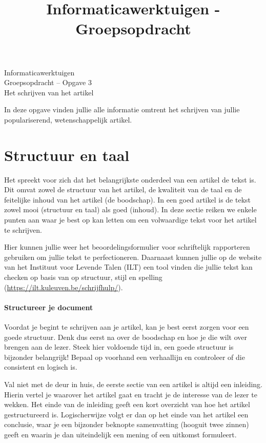 \documentclass[a4paper]{article}
\title{Informaticawerktuigen - Groepsopdracht}
\begin{document}
\begin{center}
  \huge Informaticawerktuigen \\
  \Huge Groepsopdracht -- Opgave 3 \\
  \huge Het schrijven van het artikel
\end{center}
\vspace{1em}

In deze opgave vinden jullie alle informatie omtrent het schrijven van jullie populariserend, wetenschappelijk artikel.


\section{Structuur en taal}

Het spreekt voor zich dat het belangrijkste onderdeel van een artikel de tekst is.
Dit omvat zowel de structuur van het artikel, de kwaliteit van de taal en de feitelijke inhoud van het artikel (de boodschap).
In een goed artikel is de tekst zowel mooi (structuur en taal) als goed (inhoud).
In deze sectie reiken we enkele punten aan waar je best op kan letten om een volwaardige tekst voor het artikel te schrijven.

Hier kunnen jullie weer het beoordelingsformulier voor schriftelijk rapporteren gebruiken om jullie tekst te perfectioneren.
Daarnaast kunnen jullie op de website van het Instituut voor Levende Talen (ILT) een tool vinden die jullie tekst kan checken op basis van op structuur, stijl en spelling (\url{https://ilt.kuleuven.be/schrijfhulp/}).


\paragraph{Structureer je document}

Voordat je begint te schrijven aan je artikel, kan je best eerst zorgen voor een goede structuur.
Denk dus eerst na over de boodschap en hoe je die wilt over brengen aan de lezer.
Steek hier voldoende tijd in, een goede structuur is bijzonder belangrijk!
Bepaal op voorhand een verhaallijn en controleer of die consistent en logisch is.

Val niet met de deur in huis, de eerste sectie van een artikel is altijd een inleiding.
Hierin vertel je waarover het artikel gaat en tracht je de interesse van de lezer te wekken.
Het einde van de inleiding geeft een kort overzicht van hoe het artikel gestructureerd is.
Logischerwijze volgt er dan op het einde van het artikel een conclusie, waar je een bijzonder beknopte samenvatting (hooguit twee zinnen) geeft en waarin je dan uiteindelijk een mening of een uitkomst formuleert.
\end{document}
